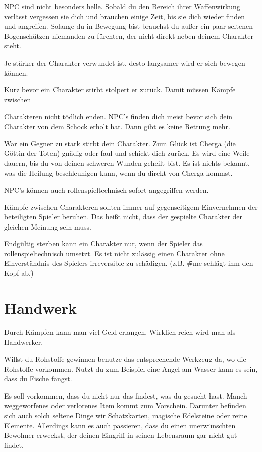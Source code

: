 \documentclass[a4paper,11pt]{book}
\begin{document}
NPC sind nicht besonders helle. Sobald du den Bereich ihrer Waffenwirkung verlässt vergessen sie dich und brauchen einige Zeit, bis sie dich wieder finden und angreifen. Solange du in Bewegung bist brauchst du außer ein paar seltenen Bogenschützen niemanden zu fürchten, der nicht direkt neben deinem Charakter steht.

Je stärker der Charakter verwundet ist, desto langsamer wird er sich bewegen können.

Kurz bevor ein Charakter stirbt stolpert er zurück. Damit müssen Kämpfe zwischen

Charakteren nicht tödlich enden. NPC’s finden dich meist bevor sich dein Charakter von dem Schock erholt hat. Dann gibt es keine Rettung mehr.

War ein Gegner zu stark stirbt dein Charakter. Zum Glück ist Cherga (die Göttin der Toten) gnädig oder faul und schickt dich zurück. Es wird eine Weile dauern, bis du von deinen schweren Wunden geheilt bist. Es ist nichts bekannt, was die Heilung beschleunigen kann, wenn du direkt von Cherga kommst.



NPC’s können auch rollenspieltechnisch sofort angegriffen werden.

 Kämpfe zwischen Charakteren sollten immer auf gegenseitigem Einvernehmen der beteiligten Spieler beruhen. Das heißt nicht, dass der gespielte Charakter der gleichen Meinung sein muss.

Endgültig sterben kann ein Charakter nur, wenn der Spieler das rollenspieltechnisch umsetzt. Es ist nicht zulässig einen Charakter ohne Einverständnis des Spielers irreversible zu schädigen. (z.B. \"\#me schlägt ihm den Kopf ab.\")

\section{Handwerk}

Durch Kämpfen kann man viel Geld erlangen. Wirklich reich wird man als Handwerker.

Willst du Rohstoffe gewinnen benutze das entsprechende Werkzeug da, wo die Rohstoffe vorkommen. Nutzt du zum Beispiel eine Angel am Wasser kann es sein, dass du Fische fängst.

Es soll vorkommen, dass du nicht nur das findest, was du gesucht hast. Manch weggeworfenes oder verlorenes Item kommt zum Vorschein. Darunter befinden sich auch solch seltene Dinge wir Schatzkarten, magische Edelsteine oder reine Elemente. Allerdings kann es auch passieren, dass du einen unerwünschten Bewohner erweckst, der deinen Eingriff in seinen Lebensraum gar nicht gut findet.
\end{document}
